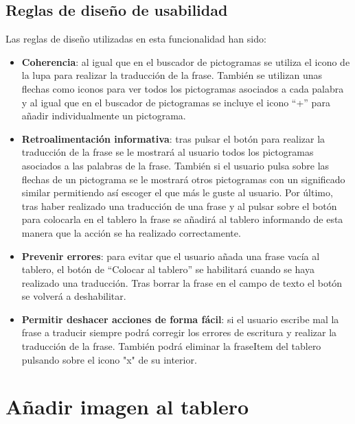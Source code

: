 \subsection{Reglas de diseño de usabilidad}
 Las reglas de diseño utilizadas en esta funcionalidad han sido:
 
\begin{itemize}
	\item \textbf{Coherencia}: al igual que en el buscador de pictogramas se utiliza el icono de la lupa para realizar la traducción de la frase. También se utilizan unas flechas como iconos para ver todos los pictogramas asociados a cada palabra y al igual que en el buscador de pictogramas se incluye el icono “+” para añadir individualmente un pictograma.
	
	\item \textbf{Retroalimentación informativa}: tras pulsar el botón para realizar la traducción de la frase se le mostrará al usuario todos los pictogramas asociados a las palabras de la frase.  También si el usuario pulsa sobre las flechas de un pictograma se le mostrará otros pictogramas con un significado similar permitiendo así escoger el que más le guste al usuario. Por último, tras haber realizado una traducción de una frase y al pulsar sobre el botón para colocarla en el tablero la frase se añadirá al tablero informando de esta manera que la acción se ha realizado correctamente.
	
	\item \textbf{Prevenir errores}: para evitar que el usuario añada una frase vacía al tablero, el botón de “Colocar al tablero” se habilitará cuando se haya realizado una traducción. Tras borrar la frase en el campo de texto el botón se volverá a deshabilitar.
	
	
	\item \textbf{Permitir deshacer acciones de forma fácil}: si el usuario escribe mal la frase a traducir siempre podrá corregir los errores de escritura y realizar la traducción de la frase. También podrá eliminar la fraseItem del tablero pulsando sobre el icono "x" de su interior.
	
\end{itemize}





\section{Añadir imagen al tablero}

